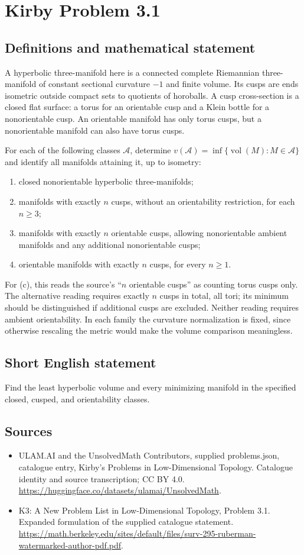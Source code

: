 \documentclass[11pt,a4paper]{article}
\begin{document}
\section*{Kirby Problem 3.1}\label{statement}

\subsection{Definitions and mathematical statement}
A hyperbolic three-manifold here is a connected complete Riemannian
three-manifold of constant sectional curvature $-1$ and finite volume.
Its cusps are ends isometric outside compact sets to quotients of horoballs.
A cusp cross-section is a closed flat surface: a torus for an orientable
cusp and a Klein bottle for a nonorientable cusp. An orientable manifold
has only torus cusps, but a nonorientable manifold can also have torus cusps.

For each of the following classes $\mathcal A$, determine
$v(\mathcal A)=\inf\{\operatorname{vol}(M):M\in\mathcal A\}$ and identify
all manifolds attaining it, up to isometry:
\begin{enumerate}
\item closed nonorientable hyperbolic three-manifolds;
\item manifolds with exactly $n$ cusps, without an orientability restriction,
for each $n\geq3$;
\item manifolds with exactly $n$ orientable cusps, allowing nonorientable
ambient manifolds and any additional nonorientable cusps;
\item orientable manifolds with exactly $n$ cusps, for every $n\geq1$.
\end{enumerate}
For (c), this reads the source's ``$n$ orientable cusps'' as counting torus
cusps only. The alternative reading requires exactly $n$ cusps in total,
all tori; its minimum should be distinguished if additional cusps are excluded.
Neither reading requires ambient orientability. In each family the curvature normalization is fixed, since otherwise
rescaling the metric would make the volume comparison meaningless.
\subsection{Short English statement}
Find the least hyperbolic volume and every minimizing manifold in the specified closed, cusped, and orientability classes.
\subsection{Sources}
\begin{itemize}
\item[S1] ULAM.AI and the UnsolvedMath Contributors, supplied problems.json, catalogue entry, Kirby's Problems in Low-Dimensional Topology. Catalogue identity and source transcription; CC BY 4.0.
\url{https://huggingface.co/datasets/ulamai/UnsolvedMath}.
\item[S2] K3: A New Problem List in Low-Dimensional Topology, Problem 3.1. Expanded formulation of the supplied catalogue statement.
\url{https://math.berkeley.edu/sites/default/files/surv-295-ruberman-watermarked-author-pdf.pdf}.
\end{itemize}
\end{document}
